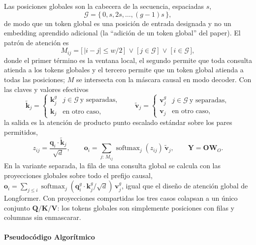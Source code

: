Las posiciones globales son la cabecera de la secuencia, espaciadas $s$,
\[
\mathcal{G} = \{\,0, s, 2s, \dots, (g-1)s\,\},
\]
de modo que un token global es una posición de entrada designada y no un embedding aprendido adicional (la ``adición de un token global'' del paper). El patrón de atención es
\[
M_{ij} = \big[\,|i-j| \le w/2\,\big] \;\vee\; \big[\,j \in \mathcal{G}\,\big] \;\vee\; \big[\,i \in \mathcal{G}\,\big],
\]
donde el primer término es la ventana local, el segundo permite que toda consulta atienda a los tokens globales y el tercero permite que un token global atienda a todas las posiciones; $M$ se intersecta con la máscara causal en modo decoder. Con las claves y valores efectivos
\[
\tilde{\mathbf{k}}_j = \begin{cases} \mathbf{k}^{g}_j & j \in \mathcal{G}\ \text{y separadas}, \\ \mathbf{k}_j & \text{en otro caso}, \end{cases}
\qquad
\tilde{\mathbf{v}}_j = \begin{cases} \mathbf{v}^{g}_j & j \in \mathcal{G}\ \text{y separadas}, \\ \mathbf{v}_j & \text{en otro caso}, \end{cases}
\]
la salida es la atención de producto punto escalado estándar sobre los pares permitidos,
\[
z_{ij} = \frac{\mathbf{q}_i \cdot \tilde{\mathbf{k}}_j}{\sqrt{d}}, \qquad
\mathbf{o}_i = \sum_{j:\,M_{ij}} \operatorname{softmax}_j(z_{ij})\,\tilde{\mathbf{v}}_j, \qquad
\mathbf{Y} = \mathbf{O}\mathbf{W}_O .
\]
En la variante separada, la fila de una consulta global se calcula con las proyecciones globales sobre todo el prefijo causal, $\mathbf{o}_i = \sum_{j \le i} \operatorname{softmax}_j(\mathbf{q}^{g}_i \cdot \mathbf{k}^{g}_j/\sqrt{d})\,\mathbf{v}^{g}_j$, igual que el diseño de atención global de Longformer. Con proyecciones compartidas los tres casos colapsan a un único conjunto $\mathbf{Q}/\mathbf{K}/\mathbf{V}$: los tokens globales son simplemente posiciones con filas y columnas sin enmascarar.

\paragraph{Pseudocódigo Algorítmico}

